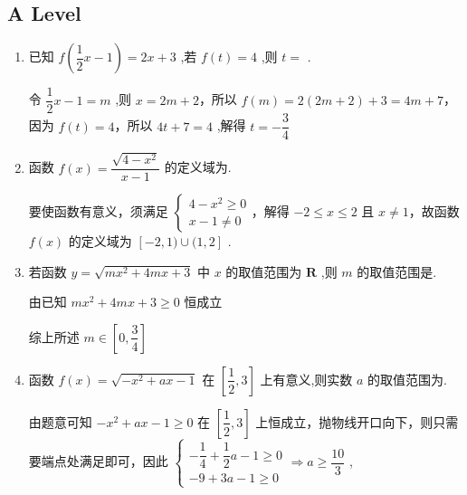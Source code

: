 \subsection*{A Level}
\begin{enumerate}
    \item 已知 $f\left( {\dfrac{1}{2}x - 1}\right)  = {2x} + 3$ ,若 $f\left( t\right)  = 4$ ,则 $t =$ .
    \begin{jieda}
        令 $\dfrac{1}{2}x - 1 = m$ ,则 $x = {2m} + 2$，所以 $f\left( m\right)  = 2\left( {{2m} + 2}\right)  + 3 = {4m} + 7$，因为 $f\left( t\right)  = 4$，所以 ${4t} + 7 = 4$ ,解得 $t =  - \dfrac{3}{4}$
    \end{jieda}
    \item 函数 $f\left( x\right)  = \dfrac{\sqrt{4 - {x}^{2}}}{x - 1}$ 的定义域为.
    \begin{jieda}
        要使函数有意义，须满足 $\left\{  \begin{array}{l} 4 - {x}^{2} \geq  0 \\  x - 1 \neq  0 \end{array}\right.$，解得 $- 2 \leq  x \leq  2$ 且 $x \neq  1$，故函数 $f\left( x\right)$ 的定义域为 $\left\lbrack  {-2, 1) \cup  (1,2}\right\rbrack$ .
    \end{jieda}
    \item 若函数 $y = \sqrt{m{x}^{2} + {4mx} + 3}$ 中 $x$ 的取值范围为 $\mathbf{R}$ ,则 $m$ 的取值范围是.
    \begin{jieda}
        由已知 $m{x}^{2} + {4mx} + 3 \geq  0$ 恒成立
        综上所述 $m \in  \left\lbrack  {0,\dfrac{3}{4}}\right\rbrack$ 
    \end{jieda}
    \item 函数 $f\left( x\right)  = \sqrt{-{x}^{2} + {ax} - 1}$ 在 $\left\lbrack  {\dfrac{1}{2},3}\right\rbrack$ 上有意义,则实数 $a$ 的取值范围为.
    \begin{jieda}
        由题意可知 $- {x}^{2} + {ax} - 1 \geq  0$ 在 $\left\lbrack  {\dfrac{1}{2},3}\right\rbrack$ 上恒成立，抛物线开口向下，则只需要端点处满足即可，因此 $\left\{  \begin{array}{l}  - \dfrac{1}{4} + \dfrac{1}{2}a - 1 \geq  0 \\   - 9 + {3a} - 1 \geq  0 \end{array}\right.  \Longrightarrow  a \geq  \dfrac{10}{3}$ ,
        

\end{jieda}
\end{enumerate}
